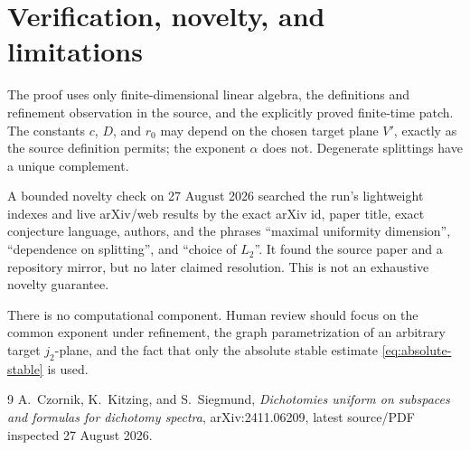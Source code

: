 \documentclass[11pt]{article}
\theoremstyle{definition}
\begin{document}
\section{Verification, novelty, and limitations}

The proof uses only finite-dimensional linear algebra, the definitions and
refinement observation in the source, and the explicitly proved finite-time
patch.  The constants $c$, $D$, and $r_0$ may depend on the chosen target
plane $V'$, exactly as the source definition permits; the exponent $\alpha$
does not.  Degenerate splittings have a unique complement.

A bounded novelty check on 27 August 2026 searched the run's lightweight
indexes and live arXiv/web results by the exact arXiv id, paper title, exact
conjecture language, authors, and the phrases ``maximal uniformity dimension'',
``dependence on splitting'', and ``choice of $L_2$''.  It found the source
paper and a repository mirror, but no later claimed resolution.  This is not
an exhaustive novelty guarantee.

There is no computational component.  Human review should focus on the common
exponent under refinement, the graph parametrization of an arbitrary target
$j_2$-plane, and the fact that only the absolute stable estimate
\eqref{eq:absolute-stable} is used.

\enlargethispage{5\baselineskip}
\begin{thebibliography}{9}
A.~Czornik, K.~Kitzing, and S.~Siegmund,
\emph{Dichotomies uniform on subspaces and formulas for dichotomy spectra},
arXiv:2411.06209, latest source/PDF inspected 27 August 2026.
\end{thebibliography}
\end{document}
